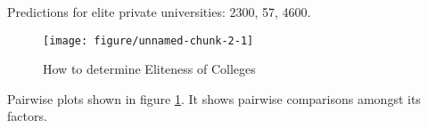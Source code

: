 \documentclass{article}\usepackage[]{graphicx}\usepackage[]{color}
\newenvironment{knitrout}{}{} %
\begin{document}
Predictions for elite private universities: 2300, 57, 4600.



\begin{figure}
\begin{center}

\begin{knitrout}
\color{fgcolor}
\texttt{[image: figure/unnamed-chunk-2-1]} 

\end{knitrout}
\caption{How to determine Eliteness of Colleges}
\label{y}
\end{center}
\end{figure}



Pairwise plots shown in figure \ref{y}. It shows pairwise comparisons amongst its factors. 


\end{document}
